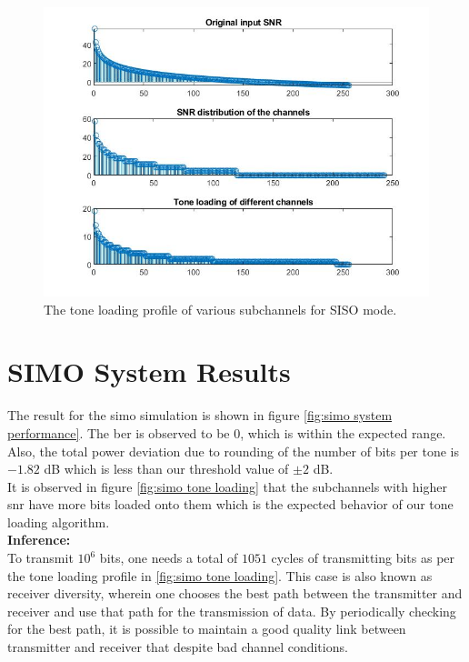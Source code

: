 \begin{figure}[!htbp]
\centering
\includegraphics[scale=0.7]{Chapter 4/Figures/SISO Tone Loading}
\caption[SISO Tone Loading]{The tone loading profile of various subchannels for SISO mode.}
\label{fig:siso tone loading}
\end{figure}

\section{SIMO System Results}
The result for the \acrshort{simo} simulation is shown in figure \ref{fig:simo system performance}. The \acrshort{ber} is observed to be $0$, which is within the expected range. Also, the total power deviation due to rounding of the number of bits per tone is $-1.82$ dB which is less than our threshold value of $\pm 2$ dB.\\
It is observed in figure \ref{fig:simo tone loading} that the subchannels with higher \acrshort{snr} have more bits loaded onto them which is the expected behavior of our tone loading algorithm.\\

\textbf{Inference:}\\
To transmit $10^6$ bits, one needs a total of $1051$ cycles of transmitting bits as per the tone loading profile in \ref{fig:simo tone loading}. This case is also known as receiver diversity, wherein one chooses the best path between the transmitter and receiver and use that path for the transmission of data. By periodically checking for the best path, it is possible to maintain a good quality link between transmitter and receiver that despite bad channel conditions.

